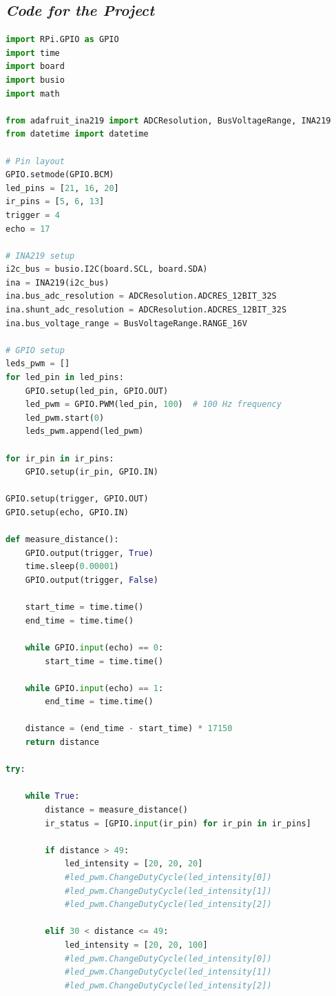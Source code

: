 \documentclass{article}
\begin{document}
\subsection{\textit{Code for the Project}}
\begin{lstlisting}[language=Python]
import RPi.GPIO as GPIO
import time
import board
import busio
import math

from adafruit_ina219 import ADCResolution, BusVoltageRange, INA219
from datetime import datetime

# Pin layout
GPIO.setmode(GPIO.BCM)
led_pins = [21, 16, 20]
ir_pins = [5, 6, 13]
trigger = 4
echo = 17

# INA219 setup
i2c_bus = busio.I2C(board.SCL, board.SDA)
ina = INA219(i2c_bus)
ina.bus_adc_resolution = ADCResolution.ADCRES_12BIT_32S
ina.shunt_adc_resolution = ADCResolution.ADCRES_12BIT_32S
ina.bus_voltage_range = BusVoltageRange.RANGE_16V

# GPIO setup
leds_pwm = []
for led_pin in led_pins:
    GPIO.setup(led_pin, GPIO.OUT)
    led_pwm = GPIO.PWM(led_pin, 100)  # 100 Hz frequency
    led_pwm.start(0)
    leds_pwm.append(led_pwm)

for ir_pin in ir_pins:
    GPIO.setup(ir_pin, GPIO.IN)

GPIO.setup(trigger, GPIO.OUT)
GPIO.setup(echo, GPIO.IN)

def measure_distance():
    GPIO.output(trigger, True)
    time.sleep(0.00001)
    GPIO.output(trigger, False)

    start_time = time.time()
    end_time = time.time()

    while GPIO.input(echo) == 0:
        start_time = time.time()

    while GPIO.input(echo) == 1:
        end_time = time.time()

    distance = (end_time - start_time) * 17150
    return distance

try:

    while True:
        distance = measure_distance()
        ir_status = [GPIO.input(ir_pin) for ir_pin in ir_pins]

        if distance > 49:
            led_intensity = [20, 20, 20]
            #led_pwm.ChangeDutyCycle(led_intensity[0])
            #led_pwm.ChangeDutyCycle(led_intensity[1])
            #led_pwm.ChangeDutyCycle(led_intensity[2])

        elif 30 < distance <= 49:
            led_intensity = [20, 20, 100]
            #led_pwm.ChangeDutyCycle(led_intensity[0])
            #led_pwm.ChangeDutyCycle(led_intensity[1])
            #led_pwm.ChangeDutyCycle(led_intensity[2])
            

\end{lstlisting}
\end{document}
